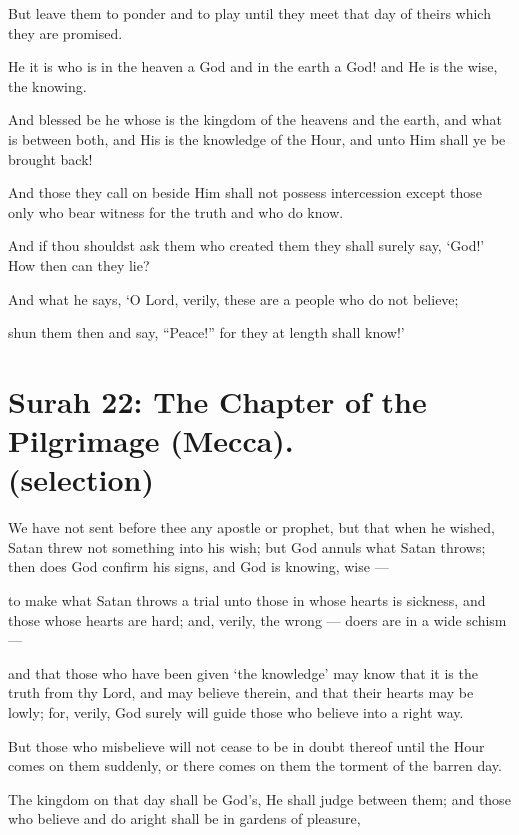 \documentclass[fontsize=14pt, letterpaper, notitlepage, openany, DIV=12]{scrbook} %
\begin{document}
\noindent[43:83]
But leave them to ponder and to play until they meet that day of theirs which they are
promised.

\noindent[43:84]
He it is who is in the heaven a God and in the earth a God! and He is the wise, the
knowing.

\noindent[43:85]
And blessed be he whose is the kingdom of the heavens and the earth, and what is
between both, and His is the knowledge of the Hour, and unto Him shall ye be brought back!

\noindent[43:86]
And those they call on beside Him shall not possess intercession except those only who
bear witness for the truth and who do know.

\noindent[43:87]
And if thou shouldst ask them who created them they shall surely say, `God!' How then
can they lie?

\noindent[43:88]
And what he says, `O Lord, verily, these are a people who do not believe;

\noindent[43:89]
shun them then and say, ``Peace!'' for they at length shall know!'


\section[Surah 22: The Chapter of the Pilgrimage (Mecca).]{Surah 22: The Chapter of the Pilgrimage (Mecca).\\ (selection)}


\noindent[22:52]
We have not sent before thee any apostle or prophet, but that when he wished, Satan
threw not something into his wish; but God annuls what Satan throws; then does God confirm his
signs, and God is knowing, wise ---

\noindent[22:53]
to make what Satan throws a trial unto those in whose hearts is sickness, and those whose
hearts are hard; and, verily, the wrong --- doers are in a wide schism ---

\noindent[22:54]
and that those who have been given `the knowledge' may know that it is the truth from
thy Lord, and may believe therein, and that their hearts may be lowly; for, verily, God surely will
guide those who believe into a right way.

\noindent[22:55]
But those who misbelieve will not cease to be in doubt thereof until the Hour comes on
them suddenly, or there comes on them the torment of the barren day.

\noindent[22:56]
The kingdom on that day shall be God's, He shall judge between them; and those who
believe and do aright shall be in gardens of pleasure,
\end{document}
